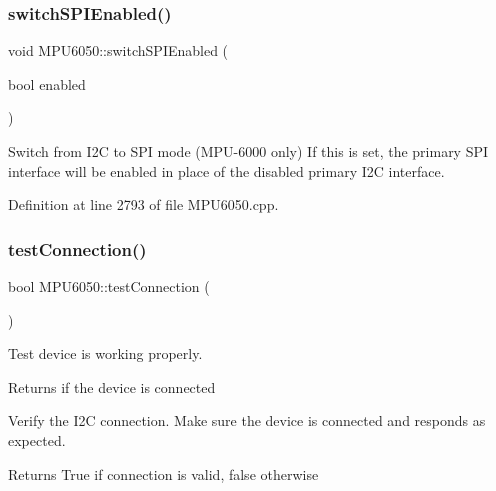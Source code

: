 \subsubsection{\texorpdfstring{switchSPIEnabled()}{switchSPIEnabled()}}
{\footnotesize\ttfamily void M\+P\+U6050\+::switch\+S\+P\+I\+Enabled (\begin{DoxyParamCaption}\item[{bool}]{enabled }\end{DoxyParamCaption})}

Switch from I2C to S\+PI mode (M\+P\+U-\/6000 only) If this is set, the primary S\+PI interface will be enabled in place of the disabled primary I2C interface. 

Definition at line 2793 of file M\+P\+U6050.\+cpp.


\begin{DoxyCode}{0}

\end{DoxyCode}
\mbox{\label{classMPU6050_a95ffab7b44fce3834236e0813687d11a}} 
\subsubsection{\texorpdfstring{testConnection()}{testConnection()}}
{\footnotesize\ttfamily bool M\+P\+U6050\+::test\+Connection (\begin{DoxyParamCaption}{ }\end{DoxyParamCaption})}

Test device is working properly.

\begin{DoxyReturn}{Returns}
if the device is connected
\end{DoxyReturn}
Verify the I2C connection. Make sure the device is connected and responds as expected. \begin{DoxyReturn}{Returns}
True if connection is valid, false otherwise 
\end{DoxyReturn}


